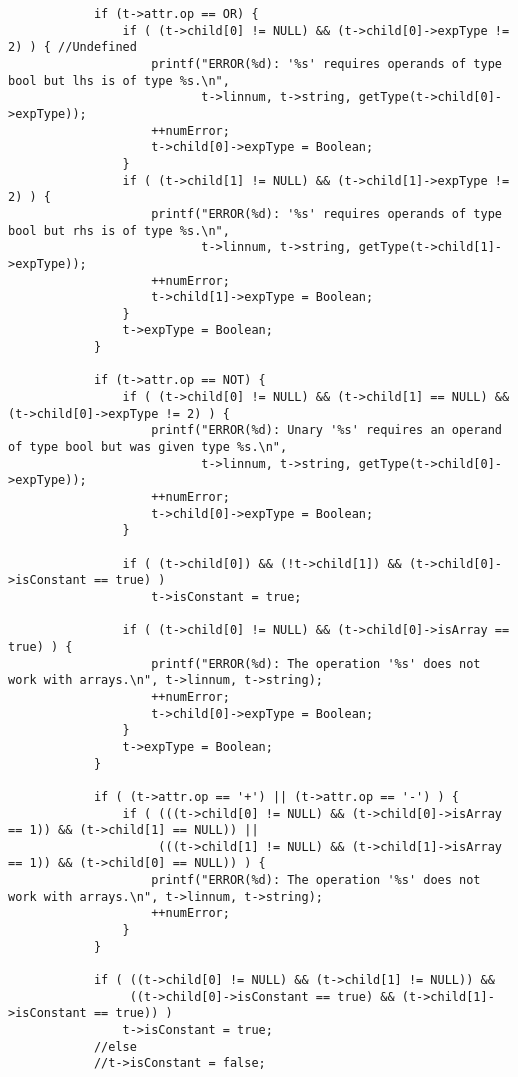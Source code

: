 \documentclass[12pt]{book}
\begin{document}
\begin{lstlisting}
            if (t->attr.op == OR) {
                if ( (t->child[0] != NULL) && (t->child[0]->expType != 2) ) { //Undefined
                    printf("ERROR(%d): '%s' requires operands of type bool but lhs is of type %s.\n", 
                           t->linnum, t->string, getType(t->child[0]->expType));
                    ++numError;
                    t->child[0]->expType = Boolean;
                }
                if ( (t->child[1] != NULL) && (t->child[1]->expType != 2) ) {
                    printf("ERROR(%d): '%s' requires operands of type bool but rhs is of type %s.\n", 
                           t->linnum, t->string, getType(t->child[1]->expType));
                    ++numError;
                    t->child[1]->expType = Boolean;
                }
                t->expType = Boolean; 
            }

            if (t->attr.op == NOT) {
                if ( (t->child[0] != NULL) && (t->child[1] == NULL) && (t->child[0]->expType != 2) ) {
                    printf("ERROR(%d): Unary '%s' requires an operand of type bool but was given type %s.\n", 
                           t->linnum, t->string, getType(t->child[0]->expType));
                    ++numError;
                    t->child[0]->expType = Boolean; 
                }

                if ( (t->child[0]) && (!t->child[1]) && (t->child[0]->isConstant == true) )
                    t->isConstant = true;

                if ( (t->child[0] != NULL) && (t->child[0]->isArray == true) ) {
                    printf("ERROR(%d): The operation '%s' does not work with arrays.\n", t->linnum, t->string);
                    ++numError;
                    t->child[0]->expType = Boolean; 
                }
                t->expType = Boolean; 
            }

            if ( (t->attr.op == '+') || (t->attr.op == '-') ) {
                if ( (((t->child[0] != NULL) && (t->child[0]->isArray == 1)) && (t->child[1] == NULL)) || 
                     (((t->child[1] != NULL) && (t->child[1]->isArray == 1)) && (t->child[0] == NULL)) ) {
                    printf("ERROR(%d): The operation '%s' does not work with arrays.\n", t->linnum, t->string);
                    ++numError;
                }
            }
   
            if ( ((t->child[0] != NULL) && (t->child[1] != NULL)) && 
                 ((t->child[0]->isConstant == true) && (t->child[1]->isConstant == true)) ) 
                t->isConstant = true;
            //else 
            //t->isConstant = false;
    

\end{lstlisting}
\end{document}
